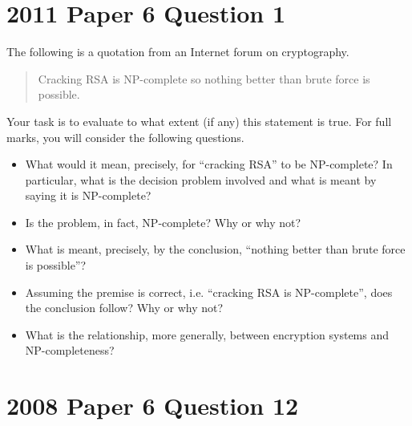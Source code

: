 \documentclass{supervision}
\begin{document}
  \begin{questions}
    \section*{2011 Paper 6 Question 1}
    \question[20] The following is a quotation from an Internet forum on
      cryptography.

      \begin{quotation}
        Cracking RSA is NP-complete so nothing better than brute force is
        possible.
      \end{quotation}

      Your task is to evaluate to what extent (if any) this statement is true.
      For full marks, you will consider the following questions.

      \begin{itemize}
        \item What would it mean, precisely, for ``cracking RSA'' to be
          NP-complete? In particular, what is the decision problem involved and
          what is meant by saying it is NP-complete?

        \item Is the problem, in fact, NP-complete? Why or why not?

        \item What is meant, precisely, by the conclusion, ``nothing better than
          brute force is possible''?

        \item Assuming the premise is correct, i.e. ``cracking RSA is
          NP-complete'', does the conclusion follow? Why or why not?

        \item What is the relationship, more generally, between encryption
          systems and NP-completeness?
      \end{itemize}

    \section*{2008 Paper 6 Question 12}
    \question
\end{questions}
\end{document}
